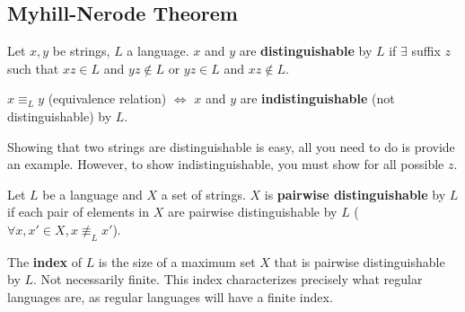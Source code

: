 \documentclass[12 pt]{article}
\begin{document}
\subsection{Myhill-Nerode Theorem}
Let $x, y$ be strings, $L$ a language. $x$ and $y$ are
\textbf{distinguishable} by $L$ if $\exists$ suffix $z$ such that $xz
\in L$ and $yz \notin L$ or $yz \in L$ and $xz \notin L$.

$x \equiv_L y$ (equivalence relation) $\iff$ $x$ and $y$ are
\textbf{indistinguishable} (not
distinguishable) by $L$.

Showing that two strings are distinguishable is easy, all you need to
do is provide an example. However, to show indistinguishable, you must
show for all possible $z$.

Let $L$ be a language and $X$ a set of strings. $X$ is
\textbf{pairwise distinguishable} by $L$ if each pair of elements in
$X$ are pairwise distinguishable by $L$ ($\forall x, x' \in X, x
\not \equiv_L x'$).

The \textbf{index} of $L$ is the size of a maximum set $X$ that is
pairwise distinguishable by $L$. Not necessarily finite. This index
characterizes precisely what regular languages are, as regular
languages will have a finite index.
\end{document}

